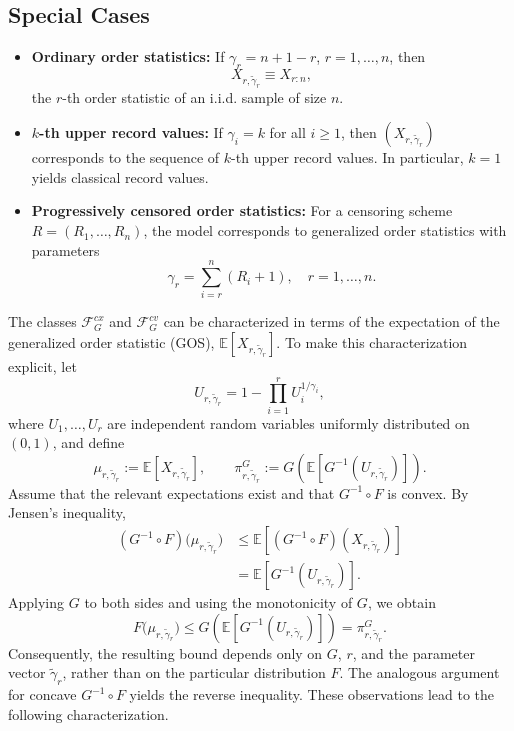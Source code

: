 \documentclass[authoryear,preprint,3p,review,10pt]{elsarticle}
\theoremstyle{definition}
\begin{document}
	\subsection*{Special Cases}
	
	\begin{itemize}
		\item \textbf{Ordinary order statistics:}  
		If $\gamma_r = n+1-r$, $r=1,\dots,n$, then
		\[
		X_{r,\tilde{\gamma}_r} \equiv X_{r:n},
		\]
		the $r$-th order statistic of an i.i.d. sample of size $n$.
		
		\item \textbf{$k$-th upper record values:}  
		If $\gamma_i = k$ for all $i \ge 1$, then $(X_{r,\tilde{\gamma}_r})$ corresponds to the sequence of $k$-th upper record values. In particular, $k=1$ yields classical record values.
		
		\item \textbf{Progressively censored order statistics:}  
		For a censoring scheme $R=(R_1,\dots,R_n)$, the model corresponds to generalized order statistics with parameters
		\[
		\gamma_r = \sum_{i=r}^{n} (R_i + 1), \quad r=1,\dots,n.
		\]
	\end{itemize}
	
	
	The classes \(\mathcal{F}_G^{cx}\) and \(\mathcal{F}_G^{cv}\) can be characterized in terms of the expectation of the generalized order statistic (GOS), \(\mathbb{E}[X_{r,\tilde{\gamma}_r}]\). To make this characterization explicit, let
	\[
	U_{r,\tilde{\gamma}_r}
	=1-\prod_{i=1}^{r}U_i^{1/\gamma_i},
	\]
	where \(U_1,\ldots,U_r\) are independent random variables uniformly distributed on \((0,1)\), and define
	\[
	\mu_{r,\tilde{\gamma}_r}
	:=\mathbb{E}[X_{r,\tilde{\gamma}_r}],
	\qquad
	\pi_{r,\tilde{\gamma}_r}^{G}
	:=G\!\left(
	\mathbb{E}\!\left[
	G^{-1}(U_{r,\tilde{\gamma}_r})
	\right]\right).
	\]
	Assume that the relevant expectations exist and that \(G^{-1}\circ F\) is convex. By Jensen's inequality,
	\[
	\begin{aligned}
		(G^{-1}\circ F)
		\bigl(\mu_{r,\tilde{\gamma}_r}\bigr)
		&\leq
		\mathbb{E}\!\left[
		(G^{-1}\circ F)(X_{r,\tilde{\gamma}_r})
		\right]\\
		&=
		\mathbb{E}\!\left[
		G^{-1}(U_{r,\tilde{\gamma}_r})
		\right].
	\end{aligned}
	\]
	Applying \(G\) to both sides and using the monotonicity of \(G\), we obtain
	\[
	F\bigl(\mu_{r,\tilde{\gamma}_r}\bigr)
	\leq
	G\!\left(
	\mathbb{E}\!\left[
	G^{-1}(U_{r,\tilde{\gamma}_r})
	\right]\right)
	=
	\pi_{r,\tilde{\gamma}_r}^{G}.
	\]
	Consequently, the resulting bound depends only on \(G\), \(r\), and the parameter vector \(\tilde{\gamma}_r\), rather than on the particular distribution \(F\). The analogous argument for concave \(G^{-1}\circ F\) yields the reverse inequality. These observations lead to the following characterization.
	
\end{document}
